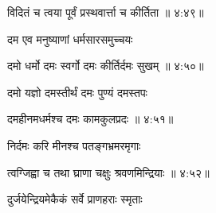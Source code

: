 
{\devanagarifont विदितं च त्वया पूर्वं प्रस्थवार्त्ता च कीर्तिता {॥ ४:४९॥} \veg\dontdisplaylinenum }%


{\devanagarifont दम एव मनुष्याणां धर्मसारसमुच्चयः \thinspace{\dandab} \dontdisplaylinenum }%


{\devanagarifont दमो धर्मो दमः स्वर्गो दमः कीर्तिर्दमः सुखम् {॥ ४:५०॥} \veg\dontdisplaylinenum }%

{\devanagarifont दमो यज्ञो दमस्तीर्थं दमः पुण्यं दमस्तपः \thinspace{\dandab} \dontdisplaylinenum }%


{\devanagarifont दमहीनमधर्मश्च दमः कामकुलप्रदः {॥ ४:५१॥} \veg\dontdisplaylinenum }%

{\devanagarifont निर्दमः करि मीनश्च पतङ्गभ्रमरमृगाः \thinspace{\dandab} \dontdisplaylinenum }%


{\devanagarifont त्वग्जिह्वा च तथा घ्राणा चक्षुः श्रवणमिन्द्रियाः {॥ ४:५२॥} \veg\dontdisplaylinenum }%

{\devanagarifont दुर्जयेन्द्रियमेकैकं सर्वे प्राणहराः स्मृताः \thinspace{\dandab} \dontdisplaylinenum }%

